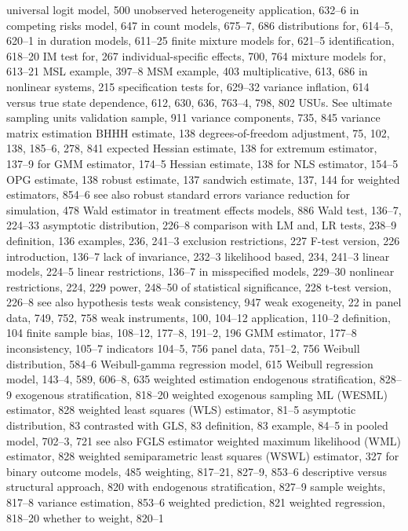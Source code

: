 universal logit model, 500
unobserved heterogeneity
application, 632–6
in competing risks model, 647
in count models, 675–7, 686
distributions for, 614–5, 620–1
in duration models, 611–25
finite mixture models for, 621–5
identification, 618–20
IM test for, 267
individual-specific effects, 700, 764
mixture models for, 613–21
MSL example, 397–8
MSM example, 403
multiplicative, 613, 686
in nonlinear systems, 215
specification tests for, 629–32
variance inflation, 614
versus true state dependence, 612, 630, 636, 763–4,
798, 802
USUs. See ultimate sampling units
validation sample, 911 variance components, 735, 845
variance matrix estimation
BHHH estimate, 138
degrees-of-freedom adjustment, 75, 102, 138,
185–6, 278, 841
expected Hessian estimate, 138 for extremum estimator, 137–9 for GMM estimator, 174–5 Hessian estimate, 138
for NLS estimator, 154–5
OPG estimate, 138
robust estimate, 137
sandwich estimate, 137, 144 for weighted estimators, 854–6 see also robust standard errors
variance reduction for simulation, 478
Wald estimator
in treatment effects models, 886
Wald test, 136–7, 224–33
asymptotic distribution, 226–8 comparison with LM and, LR tests, 238–9 definition, 136
examples, 236, 241–3
exclusion restrictions, 227
F-test version, 226
introduction, 136–7
lack of invariance, 232–3
likelihood based, 234, 241–3
linear models, 224–5
linear restrictions, 136–7
in misspecified models, 229–30
nonlinear restrictions, 224, 229
power, 248–50
of statistical significance, 228
t-test version, 226–8
see also hypothesis tests
weak consistency, 947 weak exogeneity, 22
in panel data, 749, 752, 758 weak instruments, 100, 104–12
application, 110–2
definition, 104
finite sample bias, 108–12, 177–8, 191–2, 196 GMM estimator, 177–8
inconsistency, 105–7
indicators 104–5, 756
panel data, 751–2, 756
Weibull distribution, 584–6
Weibull-gamma regression model, 615
Weibull regression model, 143–4, 589, 606–8, 635 weighted estimation
endogenous stratification, 828–9 exogenous stratification, 818–20
weighted exogenous sampling ML (WESML) estimator, 828
weighted least squares (WLS) estimator, 81–5 asymptotic distribution, 83
contrasted with GLS, 83
definition, 83
example, 84–5
in pooled model, 702–3, 721 see also FGLS estimator
weighted maximum likelihood (WML) estimator, 828
weighted semiparametric least squares (WSWL) estimator, 327
for binary outcome models, 485 weighting, 817–21, 827–9, 853–6
descriptive versus structural approach, 820 with endogenous stratification, 827–9 sample weights, 817–8
variance estimation, 853–6
weighted prediction, 821 weighted regression, 818–20 whether to weight, 820–1
